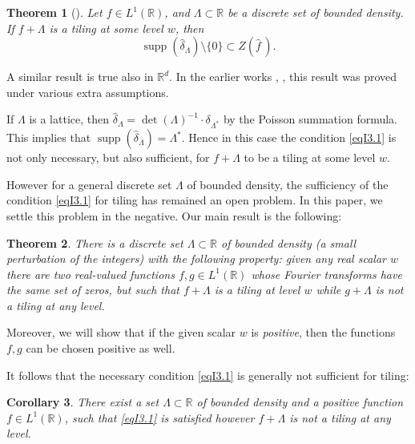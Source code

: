 \documentclass[reqno,a4paper,12pt]{amsart}
\numberwithin{equation}{section}
\numberwithin{figure}{section}
\newcommand\R{\mathbb{R}}
\newcommand\Lam{\Lambda}
\newcommand\1{\mathds{1}}
\newcommand\sbt{\subset}
\renewcommand\hat{\widehat}
\newcommand{\ft}[1]{\widehat{#1}}
\newcommand{\supp}{\operatorname{supp}}
\newcommand{\zfft}{Z(\ft{f}\,)}
\theoremstyle{plain}
\newtheorem{thm}{Theorem}[section]
\newtheorem{corollary}[thm]{Corollary}
\theoremstyle{definition}
\begin{document}
\begin{thm}[{\cite{KL16}}]
\label{thmI3.1}
Let $f\in L^1(\mathbb R)$, and $\Lambda\sbt\R$
 be a discrete set of bounded density. If $f+\Lambda$ is a tiling
at some level $w$, then
\begin{equation}
\label{eqI3.1}
\supp(\hat\delta_\Lambda) \setminus \{0\} \subset \zfft.
\end{equation}
\end{thm}

A similar result is true also in $\R^d$.
In the earlier works \cite{KL96}, \cite{Kol00a}, \cite{Kol00b}
this result was proved under various extra assumptions.


If $\Lam$ is a lattice, then 
 $\hat\delta_\Lambda = \det(\Lam)^{-1} \cdot \delta_{\Lam^*}$
by the Poisson summation formula. 
This  implies that
$\supp(\hat\delta_\Lambda) = \Lambda^*$.
Hence in this case
the condition \eqref{eqI3.1} is not
only necessary, but also sufficient,
for $f + \Lam$ to be a tiling at some level $w$.

However for a general 
discrete set $\Lambda$ of bounded density,
the sufficiency of the condition \eqref{eqI3.1} for
tiling has remained an open problem.
In this paper, we settle this problem
in the negative. Our main result is the following:



\begin{thm}
\label{thmI8.1}
There is a discrete set $\Lambda \subset \R$  of bounded density (a small perturbation of the integers) with the following property:
given any real scalar $w$ there are two real-valued functions 
$f, g \in L^1(\mathbb{R})$
whose Fourier transforms have the same set of zeros,
but such that $f + \Lambda$ is a tiling at level $w$ 
while $g + \Lambda$ is not a tiling at any level.
\end{thm}

Moreover, we will show that if the given scalar $w$ is 
\emph{positive}, then the functions $f, g$ can be chosen positive 
as well.


It follows that the necessary
condition \eqref{eqI3.1} is generally  not sufficient
for tiling: 


\begin{corollary}
\label{corI8.2}
There exist a set $\Lambda \subset \R$  of bounded density
and a positive function $f \in L^1(\mathbb{R})$,
such that \eqref{eqI3.1} is satisfied however $f + \Lam$ is not a tiling
at any level.
\end{corollary}
\end{document}
